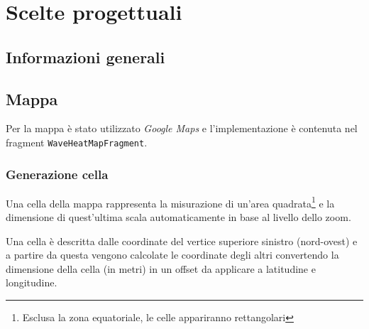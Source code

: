 \documentclass[11pt]{article}
\begin{document}
\section{Scelte progettuali}

\subsection{Informazioni generali}



\subsection{Mappa}
Per la mappa è stato utilizzato \textit{Google Maps} e l'implementazione è contenuta nel fragment \texttt{WaveHeatMapFragment}.

\subsubsection{Generazione cella}
Una cella della mappa rappresenta la misurazione di un'area quadrata\footnote{Esclusa la zona equatoriale, le celle appariranno rettangolari} e la dimensione di quest'ultima scala automaticamente in base al livello dello zoom.

Una cella è descritta dalle coordinate del vertice superiore sinistro (nord-ovest) e a partire da questa vengono calcolate le coordinate degli altri convertendo la dimensione della cella (in metri) in un offset da applicare a latitudine e longitudine.
\end{document}
